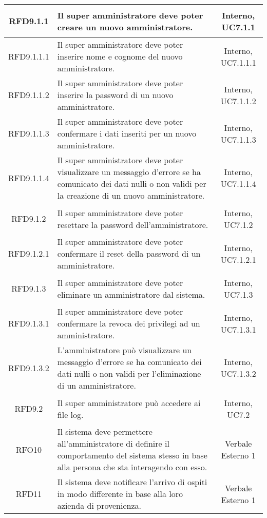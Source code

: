 \begin{longtable}{|c|>{\centering}m{7cm}|c|}
\hypertarget{RFD9.1.1}{RFD9.1.1} & Il super amministratore deve poter creare un nuovo amministratore. & Interno, UC7.1.1\\ \hline
\hypertarget{RFD9.1.1.1}{RFD9.1.1.1} & Il super amministratore deve poter inserire nome e cognome del nuovo amministratore. & Interno, UC7.1.1.1\\ \hline
\hypertarget{RFD9.1.1.2}{RFD9.1.1.2} & Il super amministratore deve poter inserire la password di un nuovo amministratore. & Interno, UC7.1.1.2\\ \hline
\hypertarget{RFD9.1.1.3}{RFD9.1.1.3} & Il super amministratore deve poter confermare i dati inseriti per un nuovo amministratore. & Interno, UC7.1.1.3\\ \hline
\hypertarget{RFD9.1.1.4}{RFD9.1.1.4} & Il super amministratore deve poter visualizzare un messaggio d'errore se ha comunicato dei dati nulli o non validi per la creazione di un nuovo amministratore. & Interno, UC7.1.1.4\\ \hline
\hypertarget{RFD9.1.2}{RFD9.1.2} & Il super amministratore deve poter resettare la password dell'amministratore. & Interno, UC7.1.2\\ \hline
\hypertarget{RFD9.1.2.1}{RFD9.1.2.1} & Il super amministratore deve poter confermare il reset della password di un amministratore. & Interno, UC7.1.2.1\\ \hline
\hypertarget{RFD9.1.3}{RFD9.1.3} & Il super amministratore deve poter eliminare un amministratore dal sistema. & Interno, UC7.1.3\\ \hline
\hypertarget{RFD9.1.3.1}{RFD9.1.3.1} & Il super amministratore deve poter confermare la revoca dei privilegi ad un amministratore. & Interno, UC7.1.3.1\\ \hline
\hypertarget{RFD9.1.3.2}{RFD9.1.3.2} & L'amministratore può visualizzare un messaggio d'errore se ha comunicato dei dati nulli o non validi per l'eliminazione di un amministratore. & Interno, UC7.1.3.2\\ \hline
\hypertarget{RFD9.2}{RFD9.2} & Il super amministratore può accedere ai file log. & Interno, UC7.2\\ \hline
\hypertarget{RFO10}{RFO10} & Il sistema deve permettere all'amministratore di definire il comportamento del sistema stesso in base alla persona che sta interagendo con esso. & Verbale Esterno 1\\ \hline
\hypertarget{RFD11}{RFD11} & Il sistema deve notificare l'arrivo di ospiti in modo differente in base alla loro azienda di provenienza. & Verbale Esterno 1\\ \hline

\end{longtable}
